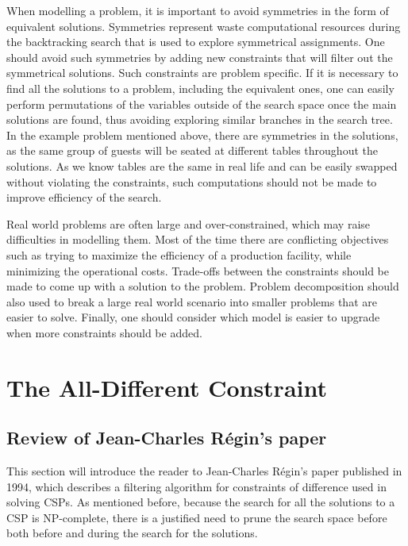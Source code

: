 \documentclass{l4proj}
\begin{document}
\noindent When modelling a problem, it is important to avoid symmetries in the form of equivalent solutions. Symmetries represent waste computational resources during the backtracking search that is used to explore symmetrical assignments. One should avoid such symmetries by adding new constraints that will filter out the symmetrical solutions. Such constraints are problem specific. If it is necessary to find all the solutions to a problem, including the equivalent ones, one can easily perform permutations of the variables outside of the search space once the main solutions are found, thus avoiding exploring similar branches in the search tree. In the example problem mentioned above, there are symmetries in the solutions, as the same group of guests will be seated at different tables throughout the solutions. As we know tables are the same in real life and can be easily swapped without violating the constraints, such computations should not be made to improve efficiency of the search.

\noindent Real world problems are often large and over-constrained, which may raise difficulties in modelling them. Most of the time there are conflicting objectives such as trying to maximize the efficiency of a production facility, while minimizing the operational costs. Trade-offs between the constraints should be made to come up with a solution to the problem. Problem decomposition should also used to break a large real world scenario into smaller problems that are easier to solve. Finally, one should consider which model is easier to upgrade when more constraints should be added.

\chapter{The All-Different Constraint}
\label{chap3alldiffconstraint}

\section{Review of Jean-Charles R\'egin's paper}
\noindent This section will introduce the reader to Jean-Charles R\'egin’s paper \cite{regin1994filtering} published in 1994, which describes a filtering algorithm for constraints of difference used in solving CSPs. As mentioned before, because the search for all the solutions to a CSP is NP-complete, there is a justified need to prune the search space before both before and during the search for the solutions.
\end{document}
